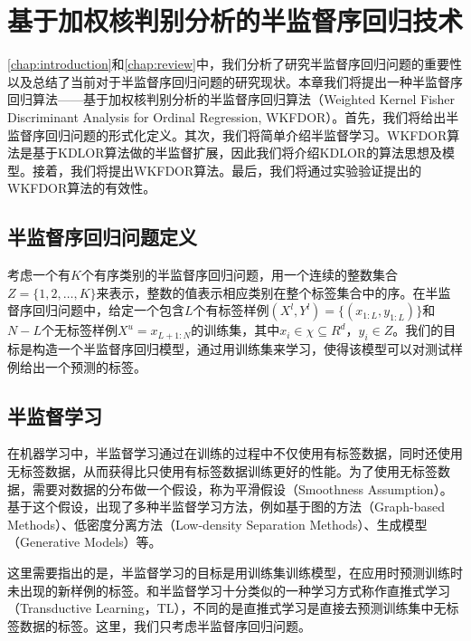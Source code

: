 \chapter{基于加权核判别分析的半监督序回归技术}
\label{chap:wkfdor}

\autoref{chap:introduction}和\autoref{chap:review}中，我们分析了研究半监督序回归问题的重要性以及总结了当前对于半监督序回归问题的研究现状。本章我们将提出一种半监督序回归算法——基于加权核判别分析的半监督序回归算法（Weighted Kernel Fisher Discriminant Analysis for Ordinal Regression, WKFDOR）。首先，我们将给出半监督序回归问题的形式化定义。其次，我们将简单介绍半监督学习。WKFDOR算法是基于KDLOR算法\citep{sun2010kernel}做的半监督扩展，因此我们将介绍KDLOR的算法思想及模型。接着，我们将提出WKFDOR算法。最后，我们将通过实验验证提出的WKFDOR算法的有效性。

\section{半监督序回归问题定义}
考虑一个有\(K\)个有序类别的半监督序回归问题，用一个连续的整数集合 \(Z=\{1,2,\dots,K\}\)来表示，整数的值表示相应类别在整个标签集合中的序。在半监督序回归问题中，给定一个包含\(L\)个有标签样例\((X^{l},Y^{l})=\{(x_{1:L},y_{1:L})\}\)和\(N-L\)个无标签样例\(X^{u} = {x_{L+1:N}}\)的训练集，其中\(x_{i} \in \chi \subseteq R^{d}\)，\(y_{i} \in Z\)。我们的目标是构造一个半监督序回归模型，通过用训练集来学习，使得该模型可以对测试样例给出一个预测的标签。

\section{半监督学习}
在机器学习中，半监督学习通过在训练的过程中不仅使用有标签数据，同时还使用无标签数据，从而获得比只使用有标签数据训练更好的性能。为了使用无标签数据，需要对数据的分布做一个假设，称为平滑假设（Smoothness Assumption）\citep{chapelle2006semi}。
基于这个假设，出现了多种半监督学习方法，例如基于图的方法（Graph-based Methods）、低密度分离方法（Low-density Separation Methods）、生成模型（Generative Models）等\citep{zhu2005semi}。

这里需要指出的是，半监督学习的目标是用训练集训练模型，在应用时预测训练时未出现的新样例的标签。和半监督学习十分类似的一种学习方式称作直推式学习（Transductive Learning，TL），不同的是直推式学习是直接去预测训练集中无标签数据的标签。这里，我们只考虑半监督序回归问题。

